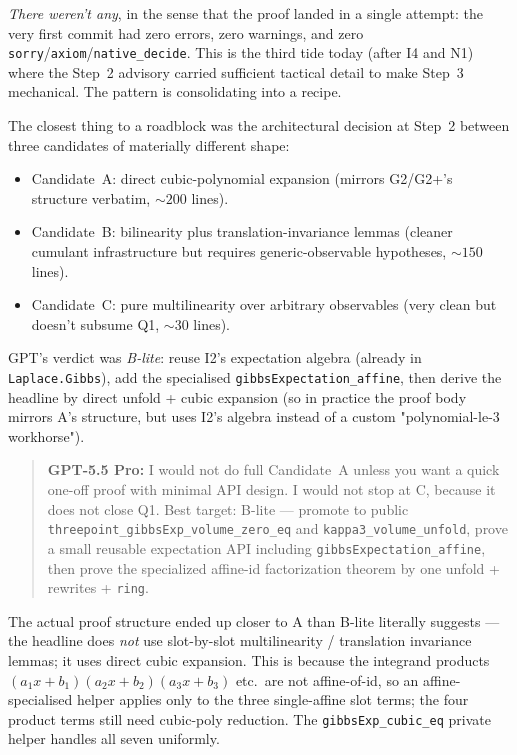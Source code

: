 \documentclass[11pt]{article}
\newcommand{\gptbox}[1]{\par\medskip\begin{quote}\small\textbf{\textcolor{green!50!black}{GPT-5.5 Pro:}} #1\end{quote}\medskip}
\begin{document}
\emph{There weren't any}, in the sense that the proof landed in a
single attempt: the very first commit had zero errors, zero warnings,
and zero \texttt{sorry}/\texttt{axiom}/\texttt{native\_decide}. This
is the third tide today (after I4 and N1) where the Step~2 advisory
carried sufficient tactical detail to make Step~3 mechanical. The
pattern is consolidating into a recipe.

The closest thing to a roadblock was the architectural decision at
Step~2 between three candidates of materially different shape:

\begin{itemize}[leftmargin=1em,itemsep=0.2em]
\item Candidate~A: direct cubic-polynomial expansion (mirrors
  G2/G2+'s structure verbatim, ${\sim}200$ lines).
\item Candidate~B: bilinearity plus translation-invariance lemmas
  (cleaner cumulant infrastructure but requires generic-observable
  hypotheses, ${\sim}150$ lines).
\item Candidate~C: pure multilinearity over arbitrary observables
  (very clean but doesn't subsume Q1, $\sim$30 lines).
\end{itemize}

GPT's verdict was \emph{B-lite}: reuse I2's expectation algebra
(already in \texttt{Laplace.Gibbs}), add the specialised
\texttt{gibbsExpectation\_affine}, then derive the headline by
direct unfold + cubic expansion (so in practice the proof body
mirrors A's structure, but uses I2's algebra instead of a custom
"polynomial-le-3 workhorse").

\gptbox{I would not do full Candidate~A unless you want a quick
one-off proof with minimal API design. I would not stop at C, because
it does not close Q1. Best target: B-lite — promote to public
\texttt{threepoint\_gibbsExp\_volume\_zero\_eq} and
\texttt{kappa3\_volume\_unfold}, prove a small reusable expectation
API including \texttt{gibbsExpectation\_affine}, then prove the
specialized affine-id factorization theorem by one unfold +
rewrites + \texttt{ring}.}

\noindent The actual proof structure ended up closer to A than B-lite
literally suggests — the headline does \emph{not} use slot-by-slot
multilinearity / translation invariance lemmas; it uses direct cubic
expansion. This is because the integrand products $(a_1 x + b_1)(a_2
x + b_2)(a_3 x + b_3)$ etc.\ are not affine-of-id, so an
affine-specialised helper applies only to the three single-affine
slot terms; the four product terms still need cubic-poly reduction.
The \texttt{gibbsExp\_cubic\_eq} private helper handles all seven
uniformly.
\end{document}
